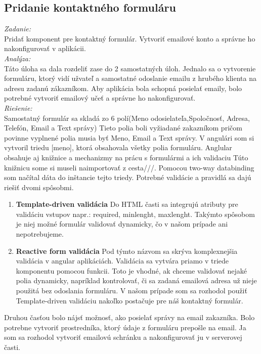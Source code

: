 \documentclass[11pt, oneside]{report}
\begin{document}
\subsection*{Pridanie kontaktného formuláru }
\textit{Zadanie:}\\
Pridať komponent pre kontaktný formulár. Vytvoriť emailové konto a správne ho nakonfigurovať v aplikácii.
\\\textit{Analýza:}\\
Táto úloha sa dala rozdeliť zase do 2 samostatných úloh. Jednalo sa o vytvorenie formuláru, ktorý vidí užvateľ a  samostatné odoslanie emailu z hrubého klienta na adresu zadanú zákazníkom. Aby aplikácia bola schopná posielať emaily, bolo potrebné vytvoriť emailový učeť a správne ho nakonfigurovať.
\\\textit{Riešenie:}\\
Samostatný formulár sa skladá zo 6 polí(Meno odosielateľa,Spoločnosť, Adresa, Telefón, Email a Text správy) Tieto polia boli vyžiadané zakazníkom  pričom povinne vyplnené polia musia byť Meno, Email a Text správy. V angulári som si vytvoril triedu [meno], ktorá obsahovala všetky polia formuláru. Anglular obsahuje aj knižnice a mechanizmy na prácu s formulármi a ich validaciu Túto knižnicu some si museli naimportovať z  \textsf{cesta///}. Pomocou two-way databinding som načítal dáta  do inštancie tejto triedy. Potrebné validácie a pravidlá sa dajú riešiť dvomi spôsobmi. 
\begin{enumerate}
\item\textbf{Template-driven validácia} Do HTML časti  sa integrujú  atributy pre validáciu vstupov napr.: \textsf{required, minlenght, maxlenght}. Takýmto spôsobom  je niej možné formulár validovať dynamicky, čo v našom prípade ani nepotrebujeme.
\item\textbf{Reactive form validácia} Pod týmto názvom sa skrýva komplexnejšia  validácia v angular aplikáciách. Validácia sa vytvára priamo v triede komponentu pomocou funkcii.  Toto je vhodné, ak chceme validovať nejaké polia dynamicky, napríklad kontrolovať, či sa zadaná emailová adresa  už nieje použitá bez odoslania formuláru.
 V našom  prípade som sa rozhodol použiť Template-driven validáciu nakoľko postačuje pre náš kontaktný formulár. 

\end{enumerate} 
 Druhou časťou bolo nájsť možnosť, ako posielať správy na email zakazníka. Bolo potrebne vytvoriť prostredníka, ktorý údaje z formuláru prepošle na email.  Ja som sa rozhodol vytvoriť emailovú schránku a nakonfigurovať ju v serverovej časti.
\end{document}

